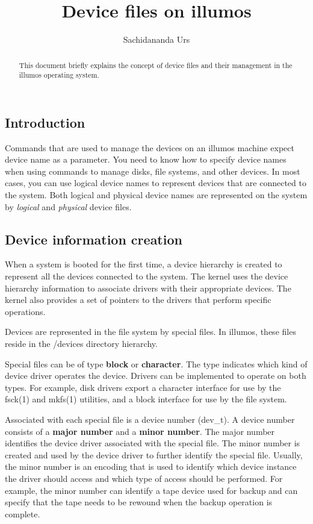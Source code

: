 \documentclass[11pt]{article}
\title{Device files on illumos}
\author{Sachidananda Urs}
\date{}
\begin{document}
\maketitle

\begin{abstract}
  This document briefly explains the concept of device files and their
  management in the illumos operating system.
\end{abstract}

\subsection*{Introduction}

Commands that are used to manage the devices on an illumos machine expect device
name as a parameter. You need to know how to specify device names when using
commands to manage disks, file systems, and other devices. In most cases, you
can use logical device names to represent devices that are connected to the
system. Both logical and physical device names are represented on the system by
{\it logical} and {\it physical} device files.

\subsection*{Device information creation}

When a system is booted for the first time, a device hierarchy is created to
represent all the devices connected to the system. The kernel uses the device
hierarchy information to associate drivers with their appropriate devices. The
kernel also provides a set of pointers to the drivers that perform specific
operations.

Devices are represented in the file system by special files. In illumos, these
files reside in the /devices directory hierarchy.

Special files can be of type {\bf block} or {\bf character}. The type indicates
which kind of device driver operates the device. Drivers can be implemented to
operate on both types. For example, disk drivers export a character interface
for use by the fsck(1) and mkfs(1) utilities, and a block interface for use by
the file system.

Associated with each special file is a device number (dev\_t). A device number
consists of a {\bf major number} and a {\bf minor number}. The major number
identifies the device driver associated with the special file. The minor number
is created and used by the device driver to further identify the special
file. Usually, the minor number is an encoding that is used to identify which
device instance the driver should access and which type of access should be
performed. For example, the minor number can identify a tape device used for
backup and can specify that the tape needs to be rewound when the backup
operation is complete.
\end{document}
